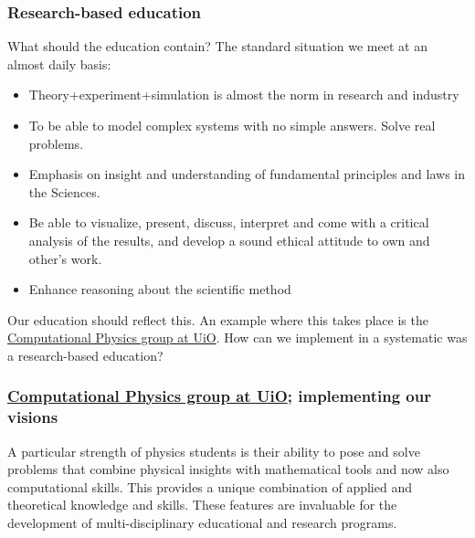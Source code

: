 \documentclass{beamer}
\begin{document}
\begin{frame}
\frametitle{Research-based education}

\begin{block}{What should the education contain? }
The standard situation we meet at an almost daily basis:

\begin{itemize}
\item Theory+experiment+simulation is almost the norm in research and industry

\item To be able to model complex systems with no simple answers. Solve real problems.

\item Emphasis on insight and understanding of fundamental principles and laws in the Sciences.

\item Be able to visualize, present, discuss, interpret and come with a critical analysis of the results, and develop a sound ethical attitude to own and other's work.

\item Enhance reasoning about the scientific method
\end{itemize}

\noindent
Our education should reflect this. An example where this takes place is the \href{{http://www.mn.uio.no/fysikk/english/research/groups/computational/index.html}}{Computational Physics group at UiO}.  How can we implement in a systematic was a research-based education? 
\end{block}
\end{frame}

\begin{frame}
\frametitle{\href{{http://www.mn.uio.no/fysikk/english/research/groups/computational/index.html}}{Computational Physics group at UiO}; implementing our visions}

\begin{block}{}
A particular strength of physics students is their ability to pose and
solve problems that combine physical insights with mathematical tools
and now also computational skills. This provides a unique combination
of applied and theoretical knowledge and skills. These features are invaluable 
for the development of multi-disciplinary educational and research programs. 
\end{block}
\end{frame}
\end{document}
